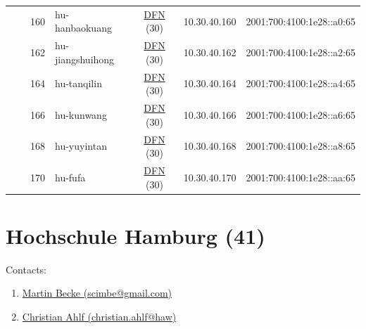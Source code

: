 \begin{small}
\begin{center}
\begin{longtable}{|c|c|c|c|c|c|c|c|}
  &  & \tiny{160} & \multicolumn{1}{|l|}{\tiny{hu-hanbaokuang}} & \multicolumn{2}{|c|}{\tiny{\href{https://www.dfn.de}{DFN} (30)}} & \tiny{10.30.40.160} & \tiny{2001:700:4100:1e28::a0:65} \\* \cline{3-3}\cline{4-4}\cline{5-5}\cline{6-6}\cline{7-7}\cline{8-8}
  &  & \tiny{162} & \multicolumn{1}{|l|}{\tiny{hu-jiangshuihong}} & \multicolumn{2}{|c|}{\tiny{\href{https://www.dfn.de}{DFN} (30)}} & \tiny{10.30.40.162} & \tiny{2001:700:4100:1e28::a2:65} \\* \cline{3-3}\cline{4-4}\cline{5-5}\cline{6-6}\cline{7-7}\cline{8-8}
  &  & \tiny{164} & \multicolumn{1}{|l|}{\tiny{hu-tanqilin}} & \multicolumn{2}{|c|}{\tiny{\href{https://www.dfn.de}{DFN} (30)}} & \tiny{10.30.40.164} & \tiny{2001:700:4100:1e28::a4:65} \\* \cline{3-3}\cline{4-4}\cline{5-5}\cline{6-6}\cline{7-7}\cline{8-8}
  &  & \tiny{166} & \multicolumn{1}{|l|}{\tiny{hu-kunwang}} & \multicolumn{2}{|c|}{\tiny{\href{https://www.dfn.de}{DFN} (30)}} & \tiny{10.30.40.166} & \tiny{2001:700:4100:1e28::a6:65} \\* \cline{3-3}\cline{4-4}\cline{5-5}\cline{6-6}\cline{7-7}\cline{8-8}
  &  & \tiny{168} & \multicolumn{1}{|l|}{\tiny{hu-yuyintan}} & \multicolumn{2}{|c|}{\tiny{\href{https://www.dfn.de}{DFN} (30)}} & \tiny{10.30.40.168} & \tiny{2001:700:4100:1e28::a8:65} \\* \cline{3-3}\cline{4-4}\cline{5-5}\cline{6-6}\cline{7-7}\cline{8-8}
  &  & \tiny{170} & \multicolumn{1}{|l|}{\tiny{hu-fufa}} & \multicolumn{2}{|c|}{\tiny{\href{https://www.dfn.de}{DFN} (30)}} & \tiny{10.30.40.170} & \tiny{2001:700:4100:1e28::aa:65} \\ \hline
\end{longtable}
\end{center}
\end{small}



\section{Hochschule Hamburg (41)}
\label{sec:HAW}

Contacts:\begin{enumerate}
 \item {}\href{mailto:scimbe@gmail.com}{Martin Becke (scimbe@gmail.com)}
 \item {}\href{mailto:christian.ahlf@haw}{Christian Ahlf (christian.ahlf@haw)}
\end{enumerate}

